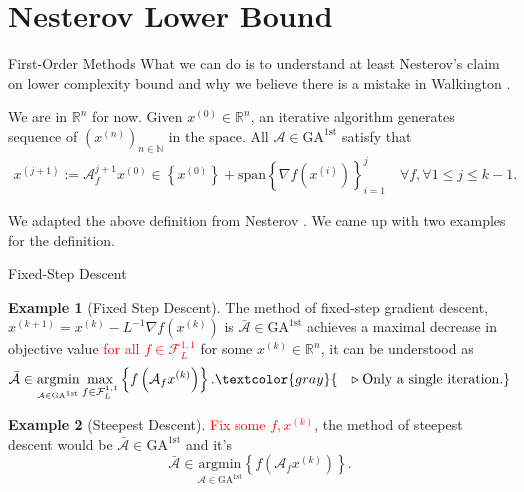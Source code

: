 \documentclass[11pt]{beamer}
\theoremstyle{definition}
\newtheorem{exmp}{Example}[section]
\begin{document}
\section{Nesterov Lower Bound}
\newcommand*{\GAfirst}{\text{GA}^{\text{1st}}}
    \begin{frame}{First-Order Methods}
        What we can do is to understand at least Nesterov's claim on lower complexity bound and why we believe there is a mistake in Walkington \cite[theorem 2.4]{noel_nesterovs_nodate}. 
        \begin{definition}
            We are in $\mathbb R^n$ for now. Given $x^{(0)} \in \mathbb R^n$, an iterative algorithm generates sequence of $\left(x^{(n)}\right)_{n \in \mathbb N}$ in the space. All $\mathcal A \in \GAfirst$ satisfy that 
            \begin{align*}
                 x^{(j + 1)}:= \mathcal A_f^{j + 1}x^{(0)} \in \left\{x^{(0)}\right\} + 
                \text{span}\left\{\nabla f\left(x^{(i)}\right)\right\}_{i = 1}^{j} \quad \forall f, \forall 1\le j \le k -1. 
            \end{align*}
        \end{definition}
        We adapted the above definition from Nesterov \cite[2.1.4]{nesterov_lecture_2018}. 
        We came up with two examples for the definition. 
    \end{frame}  
    \begin{frame}{Fixed-Step Descent}
        \begin{exmp}[Fixed Step Descent]
            The method of fixed-step gradient descent, $x^{(k + 1)} = x^{(k)} - L^{-1}\nabla f(x^{(k)})$ is $ \bar {\mathcal A}\in \GAfirst$ achieves a maximal decrease in objective value \textcolor{red}{for all $f\in \mathcal F_{L}^{1, 1}$} for some $x^{(k)}\in \mathbb R^n$, it can be understood as 
            \[
                \bar {\mathcal A} \in 
                \underset{_{\mathcal A\in \GAfirst}}{\text{argmin}}
                \max_{f\in \mathcal F_L^{1, 1}} \left\lbrace
                    f\left(
                        \mathcal A_f x^{(k)}
                    \right)
                \right\rbrace. \textcolor{gray}{\quad\triangleright\; \text{Only a single iteration.}}
            \]
        \end{exmp}
        \begin{exmp}[Steepest Descent]
            \textcolor{red}{Fix some $f, x^{(k)}$}, the method of steepest descent would be $\bar {\mathcal A}\in \GAfirst$ and it's 
            \[
                \bar {\mathcal A}\in  \underset{\mathcal A \in \GAfirst}{\text{argmin}}
                \left\lbrace
                    f\left(
                        \mathcal A_f x^{(k)}
                    \right)
                \right\rbrace. 
            \]
        \end{exmp}
    \end{frame}
    
\end{document}
